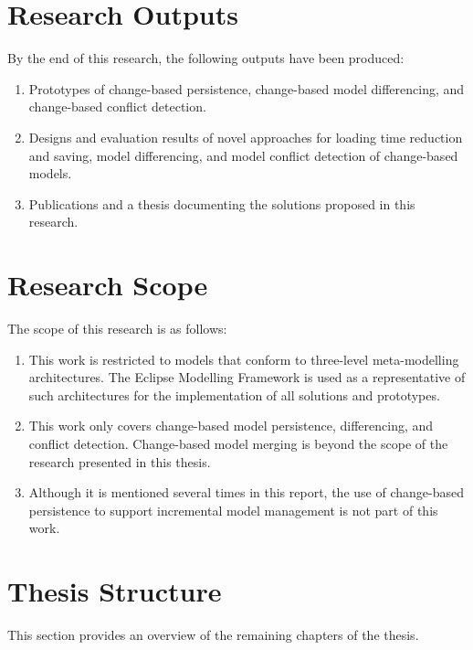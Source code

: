 \section{Research Outputs}
\label{sec:research_outputs}
By the end of this research, the following outputs have been produced:
\begin{enumerate}
  \item Prototypes of change-based persistence, change-based model differencing, and change-based conflict detection.
  \item Designs and evaluation results of novel approaches for loading time reduction and saving, model differencing, and model conflict detection of change-based models.
  \item Publications \cite{DBLP:conf/models/YohannisKP17,yohannis2018towards,DBLP:conf/models/YohannisRPK18,yohannis2019efficient} and a thesis documenting the solutions proposed in this research.
\end{enumerate}

\section{Research Scope}
\label{sec:research_scope}
The scope of this research is as follows:
\begin{enumerate}
  \item This work is restricted to models that conform to three-level meta-modelling architectures. The Eclipse Modelling Framework is used as a representative of such architectures for the implementation of all solutions and prototypes.
  \item This work only covers change-based model persistence, differencing, and conflict detection. Change-based model merging is beyond the scope of the research presented in this thesis.
  \item Although it is mentioned several times in this report, the use of change-based persistence to support incremental model management is not part of this work.
\end{enumerate}

\section{Thesis Structure}
\label{sec:Thesis Structure}
This section provides an overview of the remaining chapters of the thesis.


